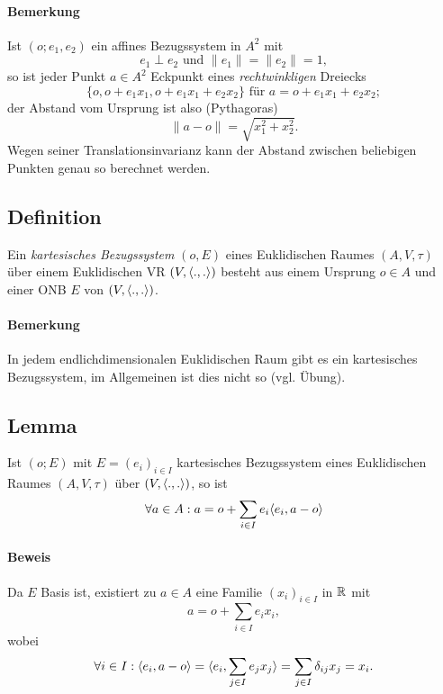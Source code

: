 \paragraph{Bemerkung}
	Ist $ (o;e_1,e_2) $ ein affines Bezugssystem in $ A^2 $ mit
		\[ e_1 \perp e_2 \text{ und } \|e_1\| = \|e_2\| = 1, \]
	so ist jeder Punkt $ a\in A^2 $ Eckpunkt eines \emph{rechtwinkligen} Dreiecks
		\[ \{o,o+e_1x_1,o+e_1x_1+e_2x_2\} \text{ für } a = o+e_1x_1+e_2x_2; \]
	der Abstand vom Ursprung ist also (Pythagoras)
		\[ \|a-o\| = \sqrt{x_1^2+x_2^2}. \]
	Wegen seiner Translationsinvarianz kann der Abstand zwischen beliebigen Punkten genau so berechnet werden.
	
\subsection{Definition}
\begin{Definition}
	Ein \emph{kartesisches Bezugssystem} $ (o,E) $ eines Euklidischen Raumes $ (A,V,\tau) $ über einem Euklidischen VR $ (V,\langle .,. \rangle) $ besteht aus einem Ursprung $ o\in A $ und einer ONB $ E $ von $ (V,\langle .,. \rangle) $.
\end{Definition}
\paragraph{Bemerkung}
	In jedem endlichdimensionalen Euklidischen Raum gibt es ein kartesisches Bezugssystem, im Allgemeinen ist dies nicht so (vgl. Übung).
	
\subsection{Lemma}
\begin{Lemma}[]
	Ist $ (o;E) $ mit $ E=(e_i)_{i\in I} $ kartesisches Bezugssystem eines Euklidischen Raumes $ (A,V,\tau) $ über $ (V,\langle .,. \rangle) $, so ist 
		\[ \forall a\in A: a = o + \sum_{i\in I} e_i \langle e_i,a-o \rangle \]
\end{Lemma}
\paragraph{Beweis}
	Da $ E $ Basis ist, existiert zu $ a\in A $ eine Familie $ (x_i)_{i\in I} $ in $ \mathbb{R} $ mit
		\[ a = o + \sum_{i\in I}e_ix_i, \]
	wobei
		\[ \forall i\in I: \langle e_i,a-o \rangle = \langle e_i,\sum_{j\in I}e_jx_j \rangle = \sum_{j\in I}\delta_{ij}x_j = x_i. \]